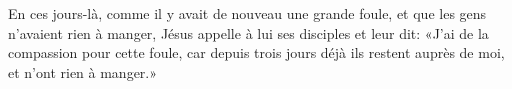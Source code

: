 En ces jours-là, comme il y avait de nouveau une grande foule,
	et que les gens n’avaient rien à manger,
	Jésus appelle à lui ses disciples et leur dit:
	«J’ai de la compassion pour cette foule,
	car depuis trois jours déjà ils restent auprès de moi, et n’ont rien à manger.»
